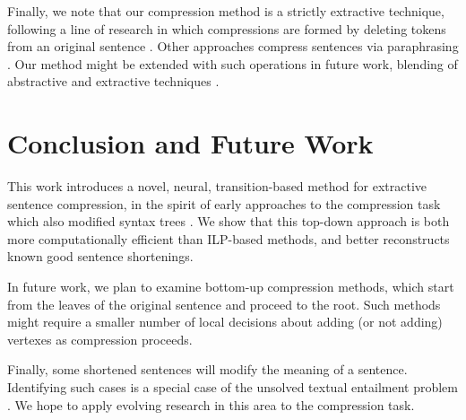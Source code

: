 \documentclass[11pt,a4paper]{article}
\begin{document}
Finally, we note that our compression method is a strictly extractive technique, following a line of research in which compressions are formed by deleting tokens from an original sentence \cite{clarke2008global,filippova2008dependency,filippova2015sentence}. Other approaches compress sentences via paraphrasing \cite{rush2015neural,mallinson18}. Our method might be extended with such operations in future work, blending of abstractive and extractive techniques \cite{P17-1099}. 

\section{Conclusion and Future Work}

This work introduces a novel, neural, transition-based method for extractive sentence compression, in the spirit of early approaches to the compression task which also modified syntax trees \cite{Jing2000SentenceRF,Knight2000StatisticsBasedS}. We show that this top-down approach is both more computationally efficient than ILP-based methods, and better reconstructs known good sentence shortenings. 

In future work, we plan to examine bottom-up compression methods, which start from the leaves of the original sentence and proceed to the root. Such methods might require a smaller number of local decisions about adding (or not adding) vertexes as compression proceeds.

Finally, some shortened sentences will modify the meaning of a sentence. Identifying such cases is a special case of the unsolved textual entailment problem \cite{snli_bowman,Pavlick2016SoCalledNA,linzencompression}. We hope to apply evolving research in this area to the compression task.  






\end{document}
